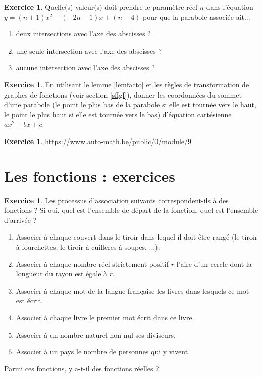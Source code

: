 \documentclass[a4paper,13pt]{scrreprt}
\theoremstyle{plain}
\theoremstyle{definition}
\newtheorem{exo}[subsection]{Exercice}
\begin{document}
\begin{exo} \label{exop12}
	Quelle(s) valeur(s) doit prendre le paramètre réel $n$ dans l'équation $y=(n+1)x^2+(-2n-1)x+(n-4)$ pour que la parabole associée ait...
	\begin{enumerate}
		\item deux intersections avec l'axe des abscisses ?
		\item une seule intersection avec l'axe des abscisses ?
		\item aucune intersection avec l'axe des abscisses ?
	\end{enumerate}
\end{exo}

\begin{exo} \label{exop13}
	En utilisant le lemme \ref{lemfacto} et les règles de transformation de graphes de fonctions (voir section \ref{sffgf}), donner les coordonnées du sommet d'une parabole (le point le plus bas de la parabole si elle est tournée vers le haut, le point le plus haut si elle est tournée vers le bas) d'équation cartésienne $ax^2 + bx +c$.
\end{exo}

\begin{exo} \label{exop14}
	\url{https://www.auto-math.be/public/0/module/9}
\end{exo}


\section{Les fonctions : exercices}

\begin{exo} \label{exof1}
	Les processus d'association suivants correspondent-ils à des fonctions ? Si oui, quel est l'ensemble de départ de la fonction, quel est l'ensemble d'arrivée ?
	\begin{enumerate}
		\item Associer à chaque couvert dans le tiroir dans lequel il doit être rangé (le tiroir à fourchettes, le tiroir à cuillères à soupes, ...).
		\item Associer à chaque nombre réel strictement positif $r$ l'aire d'un cercle dont la longueur du rayon est égale à $r$.
		\item Associer à chaque mot de la langue française les livres dans lesquels ce mot est écrit.
		\item Associer à chaque livre le premier mot écrit dans ce livre.
		\item Associer à un nombre naturel non-nul ses diviseurs.
		\item Associer à un pays le nombre de personnes qui y vivent.
	\end{enumerate}
	Parmi ces fonctions, y a-t-il des fonctions réelles ?
\end{exo}
\end{document}
